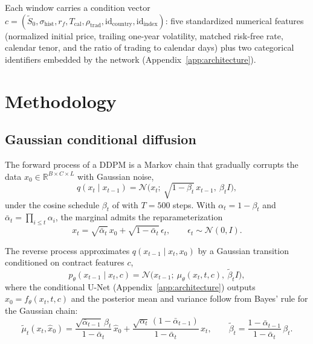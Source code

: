 \documentclass[12pt,letterpaper]{article}
\begin{document}
Each window carries a condition vector
$c = (\tilde S_0, \sigma_{\mathrm{hist}}, r_f, T_{\mathrm{cal}},
\rho_{\mathrm{trad}}, \mathrm{id}_{\mathrm{country}},
\mathrm{id}_{\mathrm{index}})$: five standardized numerical features
(normalized initial price, trailing one-year volatility, matched risk-free
rate, calendar tenor, and the ratio of trading to calendar days) plus two
categorical identifiers embedded by the network
(Appendix~\ref{app:architecture}).

\section{Methodology}\label{sec:method}

\subsection{Gaussian conditional diffusion}\label{sec:ddpm}

The forward process of a DDPM is a Markov chain that gradually corrupts the
data $x_0 \in \mathbb{R}^{B \times C \times L}$ with Gaussian noise,
\begin{equation}
q(x_t \mid x_{t-1}) = \mathcal{N}\bigl(x_t;\ \sqrt{1-\beta_t}\,x_{t-1},\
\beta_t I\bigr),
\end{equation}
under the cosine schedule $\beta_t$ of \citet{nichol2021improved} with
$T = 500$ steps. With $\alpha_t = 1 - \beta_t$ and
$\bar\alpha_t = \prod_{i \le t} \alpha_i$, the marginal admits the
reparameterization
\begin{equation}
x_t = \sqrt{\bar\alpha_t}\,x_0 + \sqrt{1-\bar\alpha_t}\,\epsilon_t,
\qquad \epsilon_t \sim \mathcal{N}(0, I).
\end{equation}

The reverse process approximates $q(x_{t-1} \mid x_t, x_0)$ by a Gaussian
transition conditioned on contract features $c$,
\begin{equation}
p_\theta(x_{t-1} \mid x_t, c) = \mathcal{N}\bigl(x_{t-1};\
\mu_\theta(x_t, t, c),\ \tilde\beta_t I\bigr),
\end{equation}
where the conditional U-Net (Appendix~\ref{app:architecture}) outputs
$\hat x_0 = f_\theta(x_t, t, c)$ and the posterior mean and variance follow
from Bayes' rule for the Gaussian chain:
\begin{equation}
\tilde\mu_t(x_t, \hat x_0)
= \frac{\sqrt{\bar\alpha_{t-1}}\,\beta_t}{1-\bar\alpha_t}\,\hat x_0
+ \frac{\sqrt{\alpha_t}\,(1-\bar\alpha_{t-1})}{1-\bar\alpha_t}\,x_t,
\qquad
\tilde\beta_t = \frac{1-\bar\alpha_{t-1}}{1-\bar\alpha_t}\,\beta_t .
\end{equation}
\end{document}
